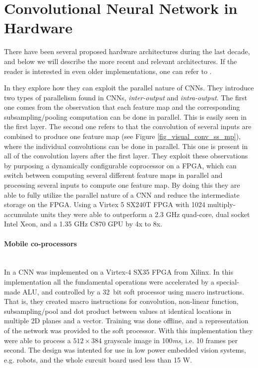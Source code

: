 \section{Convolutional Neural Network in Hardware} \label{sec_related_work_cnn}

There have been several proposed hardware architectures during the last decade, and below we will describe the more recent and relevant architectures. If the reader is interested in even older implementations, one can refer to \cite{Benkrid2002}  \cite{Cardells-Tormo2005} \cite{Hui2007} \cite{Savich2007} \cite{Girones2005}.

In \cite{Chakradhar2010} they explore how they can exploit  the parallel nature of CNNs. They introduce two types of parallelism found in CNNs, \textit{inter-output} and \textit{intra-output}. The first one comes from the observation that each feature map and the corresponding subsampling/pooling computation can be done in parallel. This is easily seen in the first layer. The second one refers to that the convolution of several inputs are combined to produce one feature map (see Figure \ref{fig_visual_conv_ss_mp}), where the individual convolutions can be done in parallel. This one is present in all of the convolution layers after the first layer. They exploit these observations by purposing a dynamically configurable coprocessor on a FPGA, which can switch between computing several different feature maps in parallel and processing several inputs to compute one feature map. By doing this they are able to fully utilize the parallel nature of a CNN and reduce the intermediate storage on the FPGA. Using a Virtex 5 SX240T FPGA with 1024 multiply-accumulate units they were able to outperform  a 2.3 GHz quad-core, dual socket Intel Xeon, and a 1.35 GHz C870 GPU by 4x to 8x.

\paragraph{Mobile co-processors} \hfil \\
In \cite{Farabet2009} a CNN was implemented on a Virtex-4 SX35 FPGA from Xilinx. In this implementation all the fundamental operations were accelerated by a special-made ALU, and controlled by a 32~bit soft processor using macro instructions. That is, they created macro instructions for convolution, non-linear function, subsampling/pool and dot product between values at identical locations in multiple 2D planes and a vector. Training was done offline, and a representation of the network was provided to the soft processor. With this implementation they were able to process a $ 512 \times 384 $ grayscale image in 100\textit{ms}, i.e. 10 frames per second. The design was intented for use in low power embedded vision  systems, e.g. robots, and the whole curcuit board used less than 15 W.

